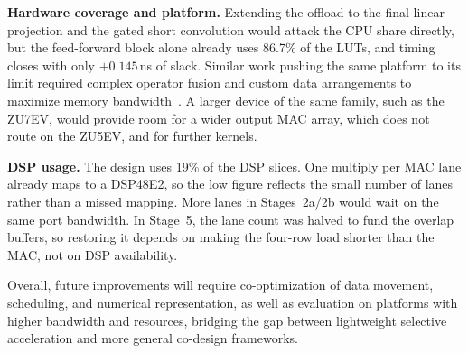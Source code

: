 \textbf{Hardware coverage and platform.} Extending the offload to the final linear
projection and the gated short convolution would attack the CPU share directly, but the
feed-forward block alone already uses 86.7\% of the LUTs, and timing closes with only
$+0.145$\,ns of slack. Similar work pushing the same platform to its limit required
complex operator fusion and custom data arrangements to maximize memory
bandwidth~\cite{Li2025Pushing}. A larger device of the same family, such as the ZU7EV,
would provide room for a wider output MAC array, which does not route on the ZU5EV, and
for further kernels.

\textbf{DSP usage.} The design uses 19\% of the DSP slices. One multiply per MAC lane
already maps to a DSP48E2, so the low figure reflects the small number of lanes rather
than a missed mapping. More lanes in Stages~2a/2b would wait on the same port bandwidth.
In Stage~5, the lane count was halved to fund the overlap buffers, so restoring it
depends on making the four-row load shorter than the MAC, not on DSP availability.

Overall, future improvements will require co-optimization of data movement, scheduling,
and numerical representation, as well as evaluation on platforms with higher bandwidth
and resources, bridging the gap between lightweight selective acceleration and more
general co-design frameworks.
